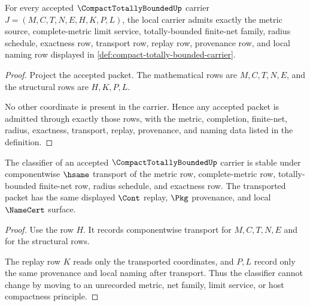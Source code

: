 \begin{theorem}
\label{thm:compact-totally-bounded-carrier-admission}
For every accepted $\CompactTotallyBoundedUp$ carrier $J=(M,C,T,N,E,H,K,P,L)$, the local carrier admits exactly the metric source, complete-metric limit service, totally-bounded finite-net family, radius schedule, exactness row, transport row, replay row, provenance row, and local naming row displayed in \autoref{def:compact-totally-bounded-carrier}.
\end{theorem}
\begin{proof}
Project the accepted packet. The mathematical rows are $M,C,T,N,E$, and the structural rows are $H,K,P,L$.

No other coordinate is present in the carrier. Hence any accepted packet is admitted through exactly those rows, with the metric, completion, finite-net, radius, exactness, transport, replay, provenance, and naming data listed in the definition.
\end{proof}

\begin{theorem}
\label{thm:compact-totally-bounded-classifier-stability}
The classifier of an accepted $\CompactTotallyBoundedUp$ carrier is stable under componentwise $\hsame$ transport of the metric row, complete-metric row, totally-bounded finite-net row, radius schedule, and exactness row. The transported packet has the same displayed $\Cont$ replay, $\Pkg$ provenance, and local $\NameCert$ surface.
\end{theorem}
\begin{proof}
Use the row $H$. It records componentwise transport for $M,C,T,N,E$ and for the structural rows.

The replay row $K$ reads only the transported coordinates, and $P,L$ record only the same provenance and local naming after transport. Thus the classifier cannot change by moving to an unrecorded metric, net family, limit service, or host compactness principle.
\end{proof}

